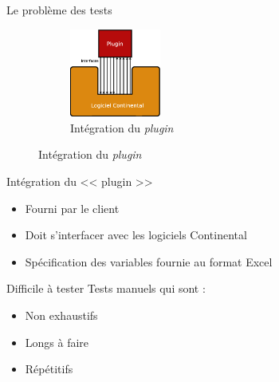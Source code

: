 \begin{frame}{Le problème des tests}
	\begin{figure}
		\vspace{-60px}
		\begin{figure}[H]
		\includegraphics[width=3cm]{images/plugin.eps}
		\caption{\scriptsize Intégration du \textit{plugin}}
		\end{figure}		
	\end{figure}

	\vfill
	\vspace{-10px}
	\begin{minipage}{0.6\textwidth}
			Intégration du << plugin >>
			\begin{itemize}
				\item Fourni par le client
				\item Doit s'interfacer avec les logiciels Continental 
				\item Spécification des variables fournie au format Excel
			\end{itemize}
				\end{minipage}
			\pause
	\vfill	
	\vspace{20px}
	\begin{alertblock}{Difficile à tester}
		Tests manuels qui sont : 
		\begin{itemize}
			\item Non exhaustifs
			\item Longs à faire
			\item Répétitifs
		\end{itemize}
	\end{alertblock}
	\vfill
\end{frame}

